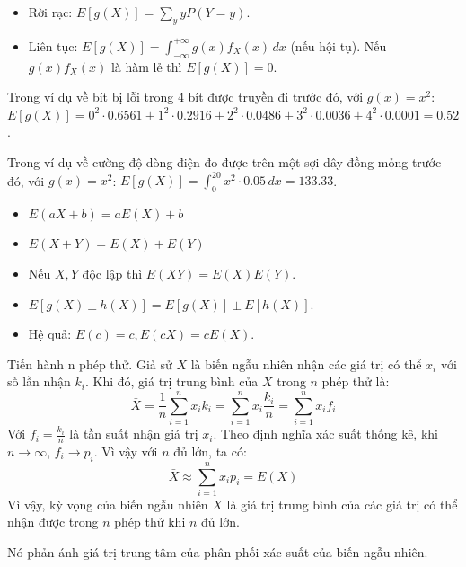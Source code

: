 \documentclass[12pt,a4paper]{article}
\begin{document}
\begin{dinhnghia}[title={Kỳ vọng $E[g(X)]$}]
  \begin{itemize}
    \item Rời rạc: $E[g(X)] = \displaystyle\sum_y y P(Y = y)$.
    \item Liên tục: $E[g(X)] = \displaystyle\int_{-\infty}^{+\infty} g(x) f_X(x)\,dx$ (nếu hội tụ). Nếu $g(x) f_X(x)$ là hàm lẻ thì $E[g(X)] = 0$.
  \end{itemize}
\end{dinhnghia}

\begin{vidu}
Trong ví dụ về bít bị lỗi trong 4 bít được truyền đi trước đó, với $g(x) = x^2$: $E[g(X)] = 0^2 \cdot 0.6561 + 1^2 \cdot 0.2916 + 2^2 \cdot 0.0486 + 3^2 \cdot 0.0036 + 4^2 \cdot 0.0001 = 0.52$.

Trong ví dụ về cường độ dòng điện đo được trên một sợi dây đồng mỏng trước đó, với $g(x) = x^2$: $E[g(X)] = \displaystyle\int_{0}^{20} x^2 \cdot 0.05\,dx = 133.33$.
\end{vidu}

\begin{tinhchat}
\begin{itemize}
  \item $E(aX + b) = aE(X) + b$
  \item $E(X + Y) = E(X) + E(Y)$
  \item Nếu $X,Y$ độc lập thì $E(XY) = E(X)E(Y)$.
  \item $E[g(X) \pm h(X)] = E[g(X)] \pm E[h(X)]$.
  \item Hệ quả: $E(c) = c, E(cX) = cE(X)$.
\end{itemize}
\end{tinhchat}

\begin{ynghia}
  Tiến hành n phép thử. Giả sử $X$ là biến ngẫu nhiên nhận các giá trị có thể $x_i$ với số lần nhận $k_i$. Khi đó, giá trị trung bình của $X$ trong $n$ phép thử là:
  \[
    \bar{X} = \frac{1}{n} \sum_{i=1}^n x_i k_i = \sum_{i=1}^n x_i \frac{k_i}{n} = \sum_{i=1}^n x_i f_i
  \]
  Với $f_i = \frac{k_i}{n}$ là tần suất nhận giá trị $x_i$.
  Theo định nghĩa xác suất thống kê, khi $n \to \infty$, $f_i \to p_i$. Vì vậy với $n$ đủ lớn, ta có:
  \[
    \bar{X} \approx \sum_{i=1}^n x_i p_i = E(X)
  \]
  Vì vậy, kỳ vọng của biến ngẫu nhiên $X$ là giá trị trung bình của các giá trị có thể nhận được trong $n$ phép thử khi $n$ đủ lớn.

  Nó phản ánh giá trị trung tâm của phân phối xác suất của biến ngẫu nhiên.
\end{ynghia}
\end{document}
